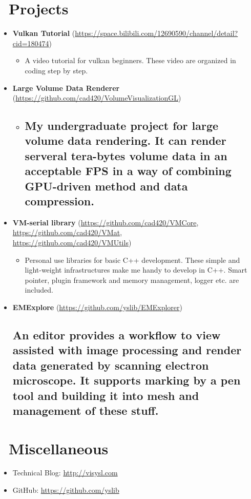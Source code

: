 \documentclass{resume}
\begin{document}
\section{\faUsers\ Projects}

\begin{itemize}

\item \textbf{Vulkan Tutorial} (\url{https://space.bilibili.com/12690590/channel/detail?cid=180474})

\begin{itemize}
  \item A video tutorial for vulkan beginners. These video are organized in coding step by step.
\end{itemize}


\item \textbf{Large Volume Data Renderer} (\url{https://github.com/cad420/VolumeVisualizationGL})

\begin{itemize}
  \item 
  \subsection{My undergraduate project for large volume data rendering. It can render serveral 
  tera-bytes volume data in an acceptable FPS in a way of combining GPU-driven method and data compression.}
\end{itemize}


\item \textbf{VM-serial library} (\url{https://github.com/cad420/VMCore}, \url{https://github.com/cad420/VMat},\\ 
 \url{https://github.com/cad420/VMUtils})

\begin{itemize}
\item Personal use libraries for basic C++ development. These simple and light-weight infrastructures make
 me handy to develop in C++. Smart pointer, plugin framework and memory management, logger etc. are included.
\end{itemize}

\item \textbf{EMExplore} (\url{https://github.com/yslib/EMExplorer})

\subsection{An editor provides a workflow to view assisted with image processing and render data generated by scanning electron microscope. 
It supports marking by a pen tool and building it into mesh and management of these stuff.}

\end{itemize}

\section{\faInfo\ Miscellaneous}
\begin{itemize}[parsep=0.5ex]
  \item Technical Blog: \url{http://visysl.com}
  \item GitHub: \url{https://github.com/yslib}
\end{itemize}
\end{document}
